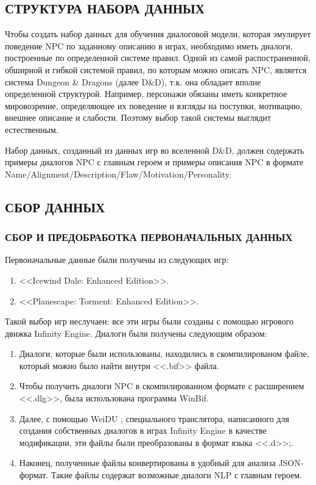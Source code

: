 \subsection{СТРУКТУРА НАБОРА ДАННЫХ}
Чтобы создать набор данных для обучения диалоговой модели, которая эмулирует поведение NPC по заданному описанию в играх, необходимо иметь диалоги, построенные по определенной системе правил. Одной из самой распостраненной, обширной и гибкой системой правил, по которым можно описать NPC, является система Dungeon \& Dragons (далее D\&D), т.к. она обладает вполне определенной структурой. Например, персонажи обязаны иметь конкретное мировозрение, определяющее их поведение и взгляды на поступки, мотивацию, внешнее описание и слабости. Поэтому выбор такой системы выглядит естественным. 

Набор данных, созданный из данных игр во вселенной D\&D, должен содержать примеры диалогов NPC с главным героем и примеры описания NPC в формате Name/Alignment/Description/Flaw/Motivation/Personality.

\subsection{СБОР ДАННЫХ}
\subsubsection{СБОР И ПРЕДОБРАБОТКА ПЕРВОНАЧАЛЬНЫХ ДАННЫХ}
Первоначальные данные были получены из следующих игр: 
\begin{enumerate}
      \item <<Icewind Dale: Enhanced Edition>>.
      \item <<Planescape: Torment: Enhanced Edition>>.
\end{enumerate}

Такой выбор игр неслучаен: все эти игры были созданы с помощью  игрового движка Infinity Engine. Диалоги были получены следующим образом:
\begin{enumerate}
      \item Диалоги, которые были использованы, находились в скомпилированом файле, который можно было найти внутри <<.bif>> файла.
      \item Чтобы получить диалоги NPC в скомпилированном формате с расширением <<.dlg>>, была использована программа WinBif.
      \item Далее, с помощью WeiDU \cite{weidu-repo}, специального транслятора,
            написанного для создания собственных диалогов в играх Infinity Engine в качестве модификации, эти файлы были преобразованы в формат языка <<.d>>;.
      \item Наконец, полученные файлы конвертированы в удобный для анализа JSON-формат. Такие файлы содержат возможные диалоги NLP с главным героем.
\end{enumerate}

